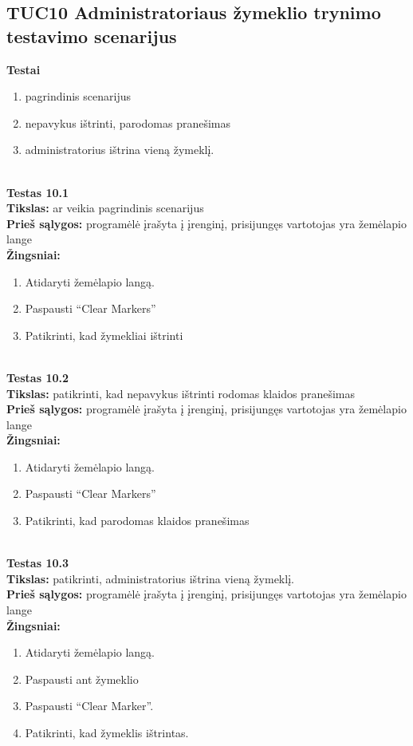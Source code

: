 \documentclass{VUMIFPSkursinis}
\begin{document}
	\subsection{TUC10 Administratoriaus žymeklio trynimo testavimo scenarijus}
		\textbf{Testai}
		\begin{enumerate}[noitemsep,topsep=0pt]
			\item pagrindinis scenarijus
			\item nepavykus ištrinti, parodomas pranešimas
			\item administratorius ištrina vieną žymeklį.
		\end{enumerate}
		\textbf{}\\
		\textbf{Testas 10.1}\\
		\textbf{Tikslas:} ar veikia pagrindinis scenarijus\\
		\textbf{Prieš sąlygos:} programėlė įrašyta į įrenginį, prisijungęs vartotojas yra žemėlapio lange\\
		\textbf{Žingsniai:}
		\begin{enumerate}[noitemsep,topsep=0pt]
			\item Atidaryti žemėlapio langą.
			\item Paspausti “Clear Markers” 
			\item Patikrinti, kad žymekliai ištrinti
		\end{enumerate}
		\textbf{}\\
		\textbf{Testas 10.2}\\
		\textbf{Tikslas:} patikrinti, kad nepavykus ištrinti rodomas klaidos pranešimas\\
		\textbf{Prieš sąlygos:} programėlė įrašyta į įrenginį, prisijungęs vartotojas yra žemėlapio lange\\
		\textbf{Žingsniai:}
		\begin{enumerate}[noitemsep,topsep=0pt]
			\item Atidaryti žemėlapio langą.
			\item Paspausti “Clear Markers” 
			\item Patikrinti, kad parodomas klaidos pranešimas
		\end{enumerate}
		\textbf{}\\
		\textbf{Testas 10.3}\\
		\textbf{Tikslas:} patikrinti, administratorius ištrina vieną žymeklį.\\
		\textbf{Prieš sąlygos:} programėlė įrašyta į įrenginį, prisijungęs vartotojas yra žemėlapio lange\\
		\textbf{Žingsniai:}
		\begin{enumerate}[noitemsep,topsep=0pt]
			\item Atidaryti žemėlapio langą.
			\item Paspausti ant žymeklio
			\item Paspausti “Clear Marker”.
			\item Patikrinti, kad žymeklis ištrintas.
		\end{enumerate}
\end{document}
